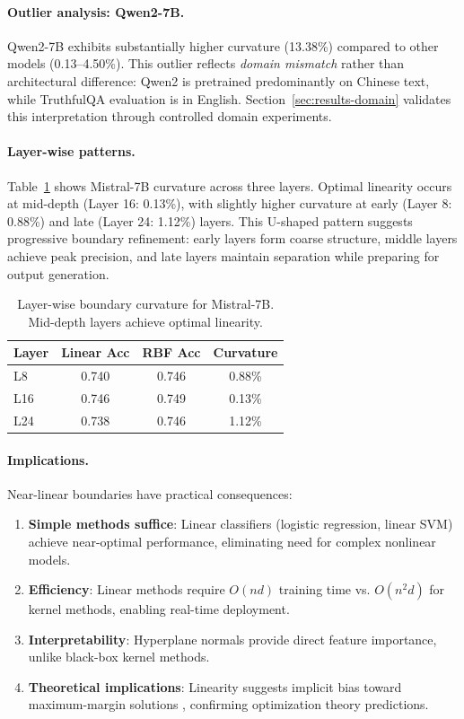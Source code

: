 \documentclass[11pt]{article}
\begin{document}
\paragraph{Outlier analysis: Qwen2-7B.} Qwen2-7B exhibits substantially higher curvature (13.38\%) compared to other models (0.13--4.50\%). This outlier reflects \textit{domain mismatch} rather than architectural difference: Qwen2 is pretrained predominantly on Chinese text, while TruthfulQA evaluation is in English. Section~\ref{sec:results-domain} validates this interpretation through controlled domain experiments.

\paragraph{Layer-wise patterns.} Table~\ref{tab:layer-wise} shows Mistral-7B curvature across three layers. Optimal linearity occurs at mid-depth (Layer 16: 0.13\%), with slightly higher curvature at early (Layer 8: 0.88\%) and late (Layer 24: 1.12\%) layers. This U-shaped pattern suggests progressive boundary refinement: early layers form coarse structure, middle layers achieve peak precision, and late layers maintain separation while preparing for output generation.

\begin{table}[h]
\centering
\caption{Layer-wise boundary curvature for Mistral-7B. Mid-depth layers achieve optimal linearity.}
\label{tab:layer-wise}
\begin{tabular}{lccc}
\toprule
Layer & Linear Acc & RBF Acc & Curvature \\
\midrule
L8 & 0.740 & 0.746 & 0.88\% \\
L16 & 0.746 & 0.749 & 0.13\% \\
L24 & 0.738 & 0.746 & 1.12\% \\
\bottomrule
\end{tabular}
\end{table}

\paragraph{Implications.} Near-linear boundaries have practical consequences:
\begin{enumerate}
\item \textbf{Simple methods suffice}: Linear classifiers (logistic regression, linear SVM) achieve near-optimal performance, eliminating need for complex nonlinear models.
\item \textbf{Efficiency}: Linear methods require $O(nd)$ training time vs. $O(n^2 d)$ for kernel methods, enabling real-time deployment.
\item \textbf{Interpretability}: Hyperplane normals provide direct feature importance, unlike black-box kernel methods.
\item \textbf{Theoretical implications}: Linearity suggests implicit bias toward maximum-margin solutions \citep{soudry2018implicit}, confirming optimization theory predictions.
\end{enumerate}
\end{document}
